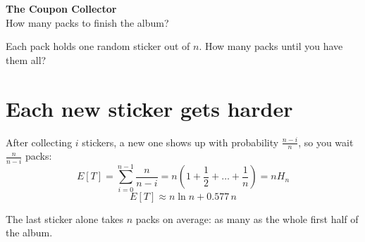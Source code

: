 \documentclass[11pt]{article}
\begin{document}
\begin{center}
  {\LARGE\bfseries The Coupon Collector}\\[4pt]
  {\large How many packs to finish the album?}
\end{center}

Each pack holds one random sticker out of \(n\).
How many packs until you have them all?

\section*{Each new sticker gets harder}
After collecting \(i\) stickers, a new one shows up with
probability \(\frac{n-i}{n}\), so you wait \(\frac{n}{n-i}\) packs:
\[
  E[T] = \sum_{i=0}^{n-1} \frac{n}{n-i}
  = n \left(1 + \frac12 + \dots + \frac1n\right) = n H_n
\]
\[
  E[T] \approx n \ln n + 0.577\, n
\]

\begin{center}
\end{center}

The last sticker alone takes \(n\) packs on average:
as many as the whole first half of the album.
\end{document}
